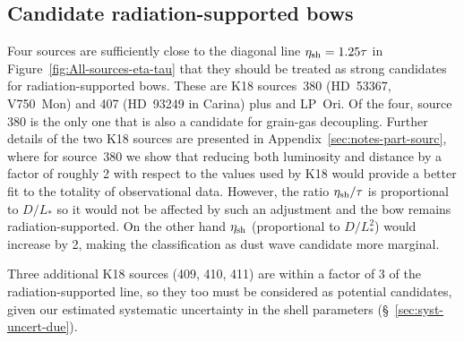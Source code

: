 \subsection{Candidate radiation-supported bows}
\label{sec:cand-radi-supp}

Four sources are sufficiently close to the diagonal line
\(\eta_{\text{sh}} = 1.25 \tau\) in Figure~\ref{fig:All-sources-eta-tau}
that they should be treated as strong candidates for
radiation-supported bows. These are K18 sources~380 (HD~53367,
V750~Mon) and 407 (HD~93249 in Carina) plus \thD{} and LP~Ori.  Of the
four, source 380 is the only one that is also a candidate for
grain-gas decoupling.  Further details of the two K18 sources are
presented in Appendix~\ref{sec:notes-part-sourc}, where for source~380
we show that reducing both luminosity and distance by a factor of
roughly 2 with respect to the values used by K18 would provide a
better fit to the totality of observational data.  However, the ratio
\(\eta_{\text{sh}} /\tau\) is proportional to \(D / L_*\) so it would not be
affected by such an adjustment and the bow remains
radiation-supported.  On the other hand \(\eta_{\text{sh}}\) (proportional
to \(D / L_*^2\)) would increase by 2, making the classification as
dust wave candidate more marginal.

Three additional K18 sources (409, 410, 411) are within a factor of 3
of the radiation-supported line, so they too must be considered as
potential candidates, given our estimated systematic uncertainty in
the shell parameters (\S~\ref{sec:syst-uncert-due}).




